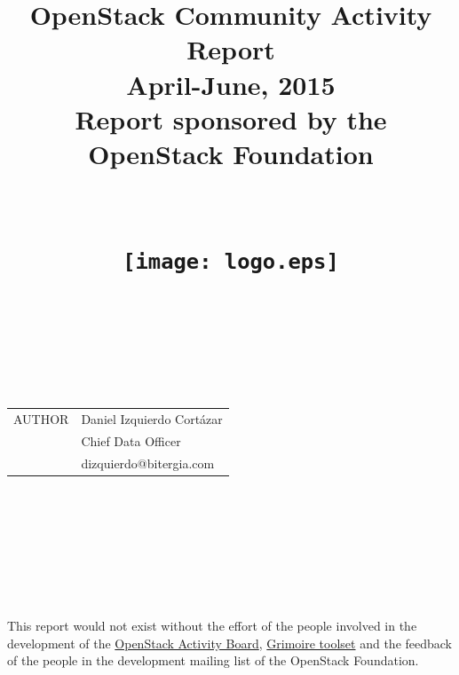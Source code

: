 \documentclass[a4wide,11pt]{report}
\begin{document}
\title{OpenStack Community Activity Report\\
      April-June, 2015 \\
      Report sponsored by the OpenStack Foundation\\
        ~~\\~~\\  \texttt{[image: logo.eps]}       \\}




\maketitle


\newpage
~~\\~\\~\\~\\
\begin{tabular}{p{5cm}p{10cm}}
AUTHOR & Daniel Izquierdo Cort\'azar \\
       & Chief Data Officer  \\
       & dizquierdo@bitergia.com \\

\end{tabular}

~~\\~~\\


~~\\
~~\\

\begin{tabular}{p{5cm}p{10cm}}

\end{tabular}

~~\\
~~\\

This report would not exist without the effort of the people involved in the development of the \href{https://activity.openstack.org/dash}{OpenStack Activity Board}, \href{http://metricsgrimoire.github.io}{Grimoire toolset} and the feedback of the people in the development mailing list of the OpenStack Foundation.
\end{document}
